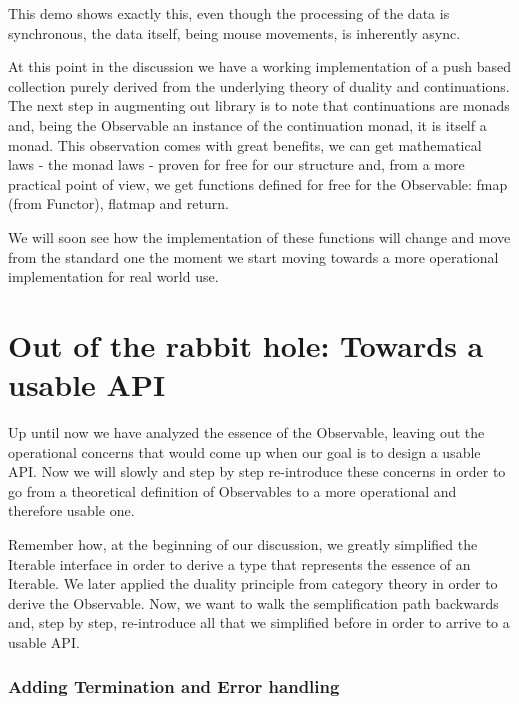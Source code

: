 This demo shows exactly this, even though the processing of the data is synchronous, the data itself, being mouse movements, is inherently async.

At this point in the discussion we have a working implementation of a push based collection purely derived from the underlying theory of duality and continuations. The next step in augmenting out library is to note that continuations are monads and, being the Observable an instance of the continuation monad, it is itself a monad. This observation comes with great benefits, we can get mathematical laws - the monad laws - proven for free for our structure and, from a more practical point of view, we get functions defined for free for the Observable: fmap (from Functor), flatmap and return.


We will soon see how the implementation of these functions will change and move from the standard one the moment we start moving towards a more operational implementation for real world use.

\chapter{Out of the rabbit hole: Towards a usable API}



Up until now we have analyzed the essence of the Observable, leaving out the operational concerns that would come up when our goal is to design a usable API. Now we will slowly and step by step re-introduce these concerns in order to go from a theoretical definition of Observables to a more operational and therefore usable one.

Remember how, at the beginning of our discussion, we greatly simplified the Iterable interface in order to derive a type that represents the essence of an Iterable. We later applied the duality principle from category theory in order to derive the Observable. Now, we want to walk the semplification path backwards and, step by step, re-introduce all that we simplified before in order to arrive to a usable API.

\subsection{Adding Termination and Error handling}
\label{subsec:subsec01}


